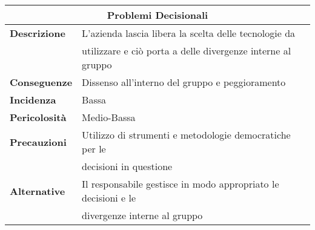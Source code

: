 \begin{center}
    \begin{tabularx}{0.8\linewidth}{l|l}
        \multicolumn{2}{c}{\textbf{Problemi Decisionali}}                                                       \\
        \hline{\textbf{Descrizione}}    & L'azienda lascia libera la scelta delle tecnologie da                 \\ 
                                        & utilizzare e ciò porta a delle divergenze interne al gruppo           \\ 
        \textbf{Conseguenze}            & Dissenso all'interno del gruppo e peggioramento                       \\
        \textbf{Incidenza}              & Bassa                                                                 \\
        \textbf{Pericolosità}           & Medio-Bassa                                                           \\
        \textbf{Precauzioni}            & Utilizzo di strumenti e metodologie democratiche per le               \\ 
                                        & decisioni in questione                                                \\
        \textbf{Alternative}            & Il responsabile gestisce in modo appropriato le decisioni e le        \\ 
                                        & divergenze interne al gruppo                                          \\     
    \end{tabularx}
\end{center}

